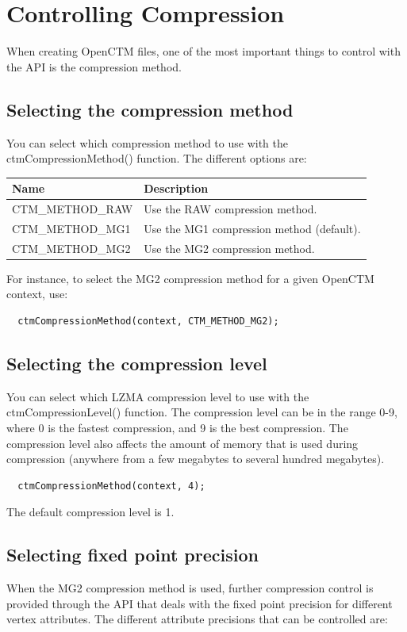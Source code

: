 
\chapter{Controlling Compression}
When creating OpenCTM files, one of the most important things to control with
the API is the compression method.


\section{Selecting the compression method}
You can select which compression method to use with the ctmCompressionMethod()
function. The different options are:

\begin{tabular}{|l|l|}\hline
\textbf{Name} & \textbf{Description}\\ \hline
CTM\_METHOD\_RAW & Use the RAW compression method.\\ \hline
CTM\_METHOD\_MG1 & Use the MG1 compression method (default).\\ \hline
CTM\_METHOD\_MG2 & Use the MG2 compression method.\\ \hline
\end{tabular}

For instance, to select the MG2 compression method for a given OpenCTM context,
use:

\begin{lstlisting}
  ctmCompressionMethod(context, CTM_METHOD_MG2);
\end{lstlisting}


\section{Selecting the compression level}
You can select which LZMA compression level to use with the ctmCompressionLevel()
function. The compression level can be in the range 0-9, where 0 is the fastest
compression, and 9 is the best compression. The compression level also affects the
amount of memory that is used during compression (anywhere from a few megabytes to
several hundred megabytes).

\begin{lstlisting}
  ctmCompressionMethod(context, 4);
\end{lstlisting}

The default compression level is 1.


\section{Selecting fixed point precision}
When the MG2 compression method is used, further compression control is provided
through the API that deals with the fixed point precision for different vertex
attributes. The different attribute precisions that can be controlled are:

